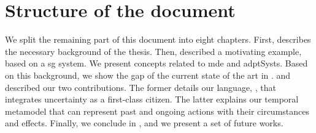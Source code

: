 \section{Structure of the document}

We split the remaining part of this document into eight chapters.
First,  describes the necessary background of the thesis.
Then,  described a motivating example, based on a \gls{sg} system.
We present concepts related to \gls{mde} and \glspl{adptSyst}.
Based on this background, we show the gap of the current state of the art in .
 and  described our two contributions.
The former details our language, \langName, that integrates uncertainty as a first-class citizen.
The latter explains our temporal \gls{metamodel} that can represent past and ongoing \glspl{action} with their circumstances and effects.
Finally, we conclude in , and we present a set of future works.